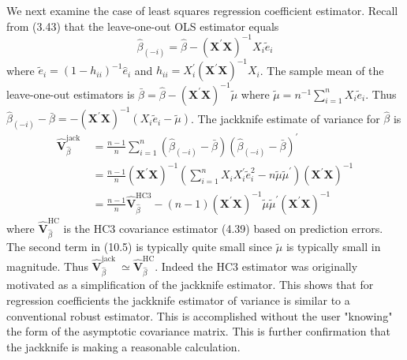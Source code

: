 \documentclass[10pt]{article}
\begin{document}
We next examine the case of least squares regression coefficient estimator. Recall from (3.43) that the leave-one-out OLS estimator equals
$$
\widehat{\beta}_{(-i)}=\widehat{\beta}-\left(\boldsymbol{X}^{\prime} \boldsymbol{X}\right)^{-1} X_{i} \widetilde{e}_{i}
$$
where $\widetilde{e}_{i}=\left(1-h_{i i}\right)^{-1} \widehat{e}_{i}$ and $h_{i i}=X_{i}^{\prime}\left(\boldsymbol{X}^{\prime} \boldsymbol{X}\right)^{-1} X_{i}$. The sample mean of the leave-one-out estimators is $\bar{\beta}=\widehat{\beta}-\left(\boldsymbol{X}^{\prime} \boldsymbol{X}\right)^{-1} \widetilde{\mu}$ where $\widetilde{\mu}=n^{-1} \sum_{i=1}^{n} X_{i} \widetilde{e}_{i}$. Thus $\widehat{\beta}_{(-i)}-\bar{\beta}=-\left(\boldsymbol{X}^{\prime} \boldsymbol{X}\right)^{-1}\left(X_{i} \widetilde{e}_{i}-\widetilde{\mu}\right)$. The jackknife estimate of variance for $\widehat{\beta}$ is
$$
\begin{aligned}
\widehat{\boldsymbol{V}}_{\widehat{\beta}}^{\text {jack }} &=\frac{n-1}{n} \sum_{i=1}^{n}\left(\widehat{\beta}_{(-i)}-\bar{\beta}\right)\left(\widehat{\beta}_{(-i)}-\bar{\beta}\right)^{\prime} \\
&=\frac{n-1}{n}\left(\boldsymbol{X}^{\prime} \boldsymbol{X}\right)^{-1}\left(\sum_{i=1}^{n} X_{i} X_{i}^{\prime} \tilde{e}_{i}^{2}-n \widetilde{\mu} \widetilde{\mu}^{\prime}\right)\left(\boldsymbol{X}^{\prime} \boldsymbol{X}\right)^{-1} \\
&=\frac{n-1}{n} \widehat{\boldsymbol{V}}_{\widehat{\beta}}^{\mathrm{HC} 3}-(n-1)\left(\boldsymbol{X}^{\prime} \boldsymbol{X}\right)^{-1} \widetilde{\mu} \widetilde{\mu}^{\prime}\left(\boldsymbol{X}^{\prime} \boldsymbol{X}\right)^{-1}
\end{aligned}
$$
where $\widehat{\boldsymbol{V}}_{\widehat{\beta}}^{\mathrm{HC}}$ is the HC3 covariance estimator (4.39) based on prediction errors. The second term in (10.5) is typically quite small since $\widetilde{\mu}$ is typically small in magnitude. Thus $\widehat{\boldsymbol{V}}_{\widehat{\beta}}^{\text {jack }} \simeq \widehat{\boldsymbol{V}}_{\widehat{\beta}}^{\mathrm{HC}}$. Indeed the HC3 estimator was originally motivated as a simplification of the jackknife estimator. This shows that for regression coefficients the jackknife estimator of variance is similar to a conventional robust estimator. This is accomplished without the user "knowing" the form of the asymptotic covariance matrix. This is further confirmation that the jackknife is making a reasonable calculation.
\end{document}
